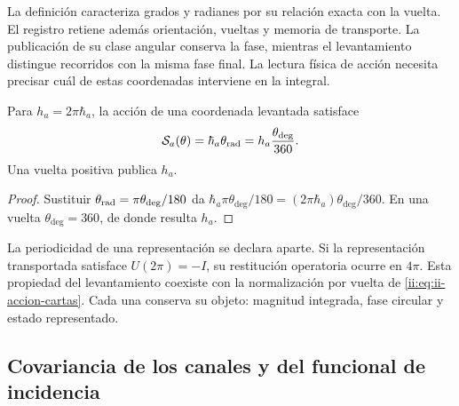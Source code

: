La definición caracteriza grados y radianes por su relación exacta
con la vuelta. El registro retiene además orientación, vueltas y
memoria de transporte. La publicación de su clase angular conserva
la fase, mientras el levantamiento distingue recorridos con la misma
fase final. La lectura física de acción necesita precisar cuál de
estas coordenadas interviene en la integral.

\begin{proposition}
Para \(h_a=2\pi\hbar_a\), la acción de una coordenada levantada
satisface
\begin{equation}
 \mathcal S_a(\theta)
 =\hbar_a\theta_{\rm rad}
 =h_a\frac{\theta_{\deg}}{360}.
 \label{ii:eq:ii-accion-cartas}
\end{equation}
Una vuelta positiva publica \(h_a\).
\end{proposition}
\begin{proof}
Sustituir \(\theta_{\rm rad}=\pi\theta_{\deg}/180\) da
\(\hbar_a\pi\theta_{\deg}/180
=(2\pi\hbar_a)\theta_{\deg}/360\). En una vuelta
\(\theta_{\deg}=360\), de donde resulta \(h_a\).
\end{proof}

La periodicidad de una representación se declara aparte. Si la
representación transportada satisface \(U(2\pi)=-I\), su restitución
operatoria ocurre en \(4\pi\). Esta propiedad del levantamiento
coexiste con la normalización por vuelta de
\eqref{ii:eq:ii-accion-cartas}. Cada una conserva su objeto: magnitud
integrada, fase circular y estado representado.

\subsection{Covariancia de los canales y del funcional de incidencia}

